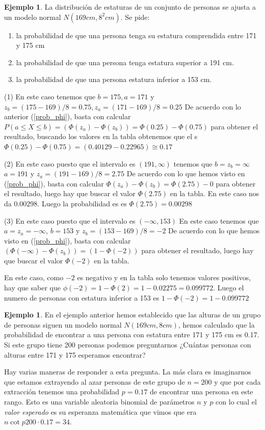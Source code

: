 \documentclass[]{book}
\theoremstyle{plain}
\theoremstyle{definition}
\newtheorem{example}[theorem]{Ejemplo}
\theoremstyle{definition} %
\begin{document}
\begin{example}
  La distribución de estaturas de un conjunto de personas se ajusta a un
modelo normal \(N(169cm,8^2 cm)\). Se pide:

\begin{enumerate}[(1)]
  \item la probabilidad de que una persona tenga su estatura comprendida entre 171 y 175 cm
  \item la probabilidad de que una persona tenga estatura superior a 191 cm.
  \item la probabilidad de que una persona estatura inferior a 153 cm.
\end{enumerate}

(1) En este caso tenemos que \(b = 175, a =171\) y
\(z_b = (175-169)/8=0.75, z_a = (171-169)/8=0.25\) De acuerdo con
lo anterior
(\ref{prob_phi}), basta
con calcular
\(P(a\leq X\leq b) = (\Phi(z_a) - \Phi(z_b))= \Phi(0.25) - \Phi(0.75)\)
para obtener el resultado, buscando los valores en la tabla obtenemos que el s
\(\Phi(0.25) - \Phi(0.75) =   (0.40129 - 0.22965) \cong 0.17\) 


(2) En este caso puesto que el intervalo es $(191,\infty)$ 
tenemos que $b = z_b = \infty$ \(a = 191\) y \(z_a = (191-169)/8=2.75\) De
acuerdo con lo que hemos visto en
(\ref{prob_phi}), basta
con calcular \(\Phi(z_a)- \Phi(z_b)= \Phi(2.75) - 0\) para obtener
el resultado, luego hay que buscar el valor \(\Phi(2.75)\) en la
tabla. En este caso nos da
\(0.00298\). Luego la probabilidad es 
es \(  \Phi(2.75)=  0.00298\)

(3)
En este caso puesto que el intervalo es $(-\infty,153)$
En este caso tenemos que $a=z_a = -\infty$, \(b = 153\) y \(z_b = (153-169)/8=-2\) De
  acuerdo con lo que hemos visto en
  (\ref{prob_phi}), basta
  con calcular \( (\Phi(-\infty) - \Phi(z_b))= (1-\Phi(-2))\) para
  obtener el resultado, luego hay que buscar el valor \(\Phi(-2)\) en la
  tabla.

  En este caso, como \(-2\) es negativo y en la tabla solo tenemos
  valores positivos, hay que saber que
  \(\phi(-2) = 1 - \Phi(2) = 1- 0.02275 = 0.099772\). Luego el numero de
  personas con estatura inferior a 153 es
  \(1-\Phi(-2)= 1-0.099772\)
 
\end{example}


\begin{example}
  En el ejemplo anterior hemos establecido que las alturas de un grupo de personas siguen un modelo normal \(N(169cm,8cm)\), hemos calculado 
  que la probabilidad de encontrar a una persona con  estatura entre 171 y 175 cm es 0.17. Si este grupo tiene 200 personas podemos preguntarnos 
  ¿Cuántas personas con alturas entre 171 y 175 esperamos encontrar?

  Hay varias maneras de responder a esta pregunta. La más clara es imaginarnos que estamos extrayendo al azar personas de este grupo 
  de $n=200$ y que por cada extracción tenemos una probabilidad $p=0.17$ de encontrar una persona en este rango. Esto es una 
  variable aleatoria binomial de parámetros $n$ y $p$ con lo cual el \emph{valor esperado} es su esperanza matemática que vimos que era
  $n\cot p 200 \cdot 0.17 = 34$.
\end{example}
\end{document}
